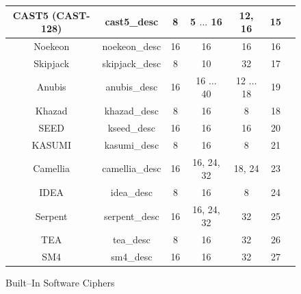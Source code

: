 \documentclass[synpaper]{book}
\begin{document}
\begin{figure}[hpbt]
\begin{small}
\begin{center}
\begin{tabular}{|c|c|c|c|c|c|c|}
     \hline CAST5 (CAST-128) & cast5\_desc & 8 & 5 $\ldots$ 16 & 12, 16 & 15 \\
     \hline Noekeon & noekeon\_desc & 16 & 16 & 16 & 16 \\
     \hline Skipjack & skipjack\_desc & 8 & 10 & 32 & 17 \\
     \hline Anubis & anubis\_desc & 16 & 16 $\ldots$ 40 & 12 $\ldots$ 18 & 19 \\
     \hline Khazad & khazad\_desc & 8 & 16 & 8 & 18 \\
     \hline SEED   & kseed\_desc & 16 & 16 & 16 & 20 \\
     \hline KASUMI & kasumi\_desc & 8 & 16 & 8 & 21 \\
     \hline Camellia & camellia\_desc & 16 & 16, 24, 32 & 18, 24 & 23 \\
     \hline IDEA & idea\_desc & 8 & 16 & 8 & 24 \\
     \hline Serpent & serpent\_desc & 16 & 16, 24, 32 & 32 & 25 \\
     \hline TEA & tea\_desc & 8 & 16 & 32 & 26 \\
     \hline SM4 & sm4\_desc & 16 & 16 & 32 & 27 \\
     \hline
\end{tabular}
\end{center}
\end{small}
\caption{Built--In Software Ciphers}
\end{figure}
\end{document}
